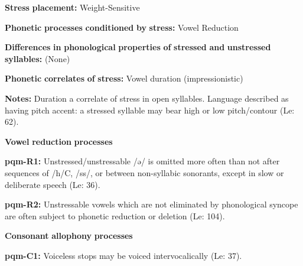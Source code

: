 \documentclass[output=paper]{langsci/langscibook}
\begin{document}
\begin{styleBody}
\textbf{Stress} \textbf{placement:} Weight-Sensitive
\end{styleBody}

\begin{styleBody}
\textbf{Phonetic} \textbf{processes} \textbf{conditioned} \textbf{by} \textbf{stress:} Vowel Reduction
\end{styleBody}

\begin{styleBody}
\textbf{Differences} \textbf{in} \textbf{phonological} \textbf{properties} \textbf{of} \textbf{stressed} \textbf{and} \textbf{unstressed} \textbf{syllables:} (None)
\end{styleBody}

\begin{styleBody}
\textbf{Phonetic} \textbf{correlates} \textbf{of} \textbf{stress:} Vowel duration (impressionistic)
\end{styleBody}

\begin{styleBody}
\textbf{Notes:} Duration a correlate of stress in open syllables. Language described as having pitch accent: a stressed syllable may bear high or low pitch/contour (Le\citealt{Sourd1993}: 62).
\end{styleBody}

\begin{styleBody}
\textbf{Vowel} \textbf{reduction} \textbf{processes}
\end{styleBody}

\begin{styleBody}
\textbf{pqm-R1:} Unstressed/unstressable /ə/ is omitted more often than not after sequences of /h/C, /ss/, or between non-syllabic sonorants, except in slow or deliberate speech (Le\citealt{Sourd1996}: 36).
\end{styleBody}

\begin{styleBody}
\textbf{pqm-R2:} Unstressable vowels which are not eliminated by phonological syncope are often subject to phonetic reduction or deletion (Le\citealt{Sourd1996}: 104).
\end{styleBody}

\begin{styleBody}
\textbf{Consonant} \textbf{allophony} \textbf{processes}
\end{styleBody}

\begin{styleBody}
\textbf{pqm-C1:} Voiceless stops may be voiced intervocalically (Le\citealt{Sourd1993}: 37).
\end{styleBody}
\end{document}
